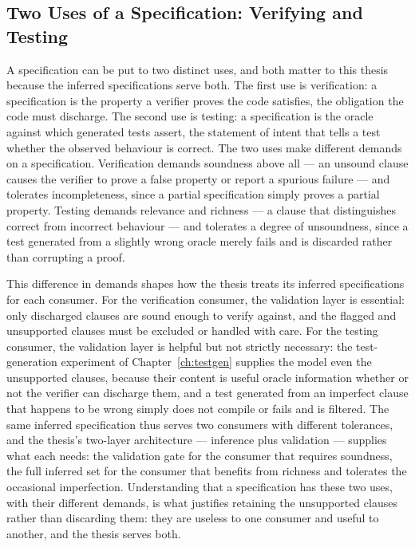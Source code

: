 \subsection{Two Uses of a Specification: Verifying and Testing}

A specification can be put to two distinct uses, and both matter to this thesis
because the inferred specifications serve both. The first use is verification: a
specification is the property a verifier proves the code satisfies, the obligation
the code must discharge. The second use is testing: a specification is the oracle
against which generated tests assert, the statement of intent that tells a test
whether the observed behaviour is correct. The two uses make different demands on a
specification. Verification demands soundness above all --- an unsound clause causes
the verifier to prove a false property or report a spurious failure --- and
tolerates incompleteness, since a partial specification simply proves a partial
property. Testing demands relevance and richness --- a clause that distinguishes
correct from incorrect behaviour --- and tolerates a degree of unsoundness, since a
test generated from a slightly wrong oracle merely fails and is discarded rather
than corrupting a proof.

This difference in demands shapes how the thesis treats its inferred
specifications for each consumer. For the verification consumer, the validation
layer is essential: only discharged clauses are sound enough to verify against, and
the flagged and unsupported clauses must be excluded or handled with care. For the
testing consumer, the validation layer is helpful but not strictly necessary: the
test-generation experiment of Chapter~\ref{ch:testgen} supplies the model even the
unsupported clauses, because their content is useful oracle information whether or
not the verifier can discharge them, and a test generated from an imperfect clause
that happens to be wrong simply does not compile or fails and is filtered. The same
inferred specification thus serves two consumers with different tolerances, and the
thesis's two-layer architecture --- inference plus validation --- supplies what each
needs: the validation gate for the consumer that requires soundness, the full
inferred set for the consumer that benefits from richness and tolerates the
occasional imperfection. Understanding that a specification has these two uses, with
their different demands, is what justifies retaining the unsupported clauses rather
than discarding them: they are useless to one consumer and useful to another, and
the thesis serves both.

